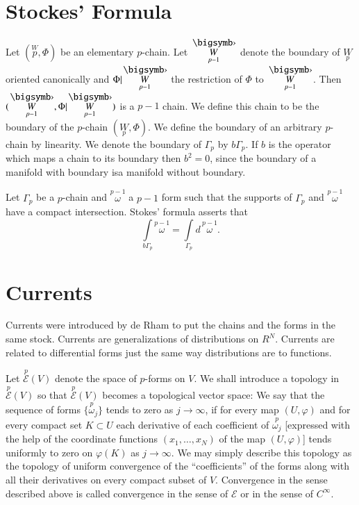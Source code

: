 \section*{Stockes' Formula}

Let $(\overset{W}{p},\Phi)$ be an elementary $p$-chain. Let
$\overset{\bigdot}{\underset{p-1}{W}}$ denote the boundary of
$\underset{p}{W}$ oriented canonically and
$\Phi|\overset{\bigdot}{\underset{p-1}{W}}$ the restriction of $\Phi$
to $\overset{\bigdot}{\underset{p-1}{W}}$. Then
$(\overset{\bigdot}{\underset{p-1}{W}},
\Phi|\overset{\bigdot}{\underset{p-1}{W}})$ 
is a $p-1$ chain. We define this chain to be the boundary of the
$p$-chain $(\underset{p}{W},\Phi)$. We define the boundary of an
arbitrary $p$-chain by linearity. We denote the boundary of
$\Gamma_{p}$ by $b\Gamma_{p}$. If $b$ is the operator which maps a
chain to its boundary then $b^{2}=0$, since the boundary of a manifold
with boundary is\pageoriginale a manifold without boundary.

Let $\Gamma_{p}$ be a $p$-chain and $\overset{p-1}{\omega}$ a $p-1$
form such that the supports of $\Gamma_{p}$ and
$\overset{p-1}{\omega}$ have a compact intersection. Stokes' formula
asserts that
$$
\int\limits_{b\Gamma_{p}}\overset{p-1}{\omega}=
\int\limits_{\Gamma_{p}}d\,\overset{p-1}{\omega}.  
$$

\section*{Currents}

Currents were introduced by de Rham to put the chains and the forms in
the same stock. Currents are generalizations of distributions on
$R^{N}$. Currents are related to differential forms just the same way
distributions are to functions.

Let $\overset{p}{\mathscr{E}}(V)$ denote the space of $p$-forms on
$V$. We shall introduce a topology in $\overset{p}{\mathscr{E}}(V)$ so
that $\overset{p}{\mathscr{E}}(V)$ becomes a topological vector space:
We say that the sequence of forms $\{\overset{p}{\omega}_{j}\}$ tends
to zero as $j\to \infty$, if for every map $(U,\varphi)$ and for every
compact set $K\subset U$ each derivative of each coefficient of
$\overset{p}{\omega_{j}}$ [expressed with the help of the coordinate
  functions $(x_{1},\ldots,x_{N})$ of the map $(U,\varphi)$] tends
uniformly to zero on $\varphi(K)$ as $j\to \infty$. We may simply
describe this topology as the topology of uniform convergence of the
``coefficients'' of the forms along with all their derivatives on
every compact subset of $V$. Convergence in the sense described above
is called convergence in the sense of $\mathscr{E}$ or in the sense of
$C^{\infty}$.

